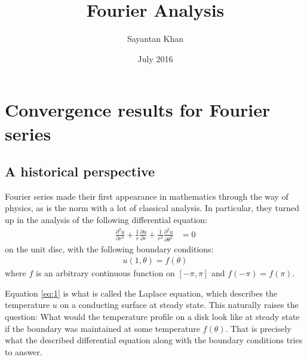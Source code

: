 \documentclass[12pt, titlepage]{article}
\title{Fourier Analysis}
\author{Sayantan Khan}
\date{July 2016}
\theoremstyle{definition}
\begin{document}
\tableofcontents

\newpage

\section{Convergence results for Fourier series}

\subsection{A historical perspective}
Fourier series made their first appearance in mathematics through the way of physics, as is the norm with a lot of classical analysis. In particular, they turned up in the analysis of the following differential equation:
\begin{align}
    \frac{\partial^2 u}{\partial r^2} + \frac{1}{r} \frac{\partial u}{\partial r} + \frac{1}{r^2} \frac{\partial^2 u}{\partial \theta^2} &= 0 \label{eq:1}
\end{align}
on the unit disc, with the following boundary conditions:
\begin{align*}
    u(1, \theta) = f(\theta)
\end{align*}
where $f$ is an arbitrary continuous function on $[-\pi, \pi]$ and $f(-\pi) = f(\pi)$.

Equation \ref{eq:1} is what is called the Laplace equation, which describes the temperature $u$ on a conducting surface at steady state. This naturally raises the question: What would the temperature profile on a disk look like at steady state if the boundary was maintained at some temperature $f(\theta)$. That is precisely what the described differential equation along with the boundary conditions tries to answer.
\end{document}
